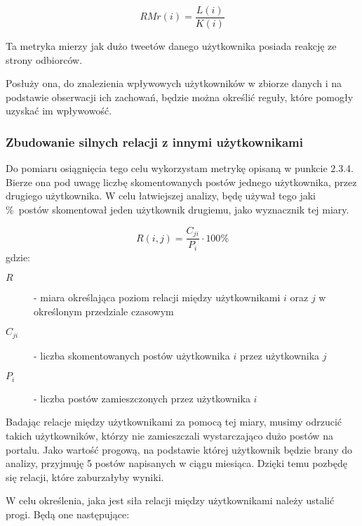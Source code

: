 \documentclass[polish,12pt]{aghthesis}
\begin{document}
\begin{equation}
    RMr(i) = \frac{L(i)}{K(i)} \label{n20}
\end{equation}

Ta metryka mierzy jak dużo tweetów danego użytkownika posiada reakcję ze strony odbiorców.

Posłuży ona, do znalezienia wpływowych użytkowników w zbiorze danych i na podstawie obserwacji ich zachowań, będzie można określić reguły, które pomogły uzyskać im wpływowość.

\subsubsection{Zbudowanie silnych relacji z innymi użytkownikami}


Do pomiaru osiągnięcia tego celu wykorzystam metrykę opisaną w punkcie 2.3.4. Bierze ona pod uwagę liczbę skomentowanych postów jednego użytkownika, przez drugiego użytkownika. W celu łatwiejszej analizy, będę używał tego jaki \%\ postów skomentował jeden użytkownik drugiemu, jako wyznacznik tej miary. 

\begin{equation}
    R(i, j) = \frac{C_{ji}}{P_i}\cdot 100\% \label{n21_2}
\end{equation}
gdzie:
\begin{description}
\item[$R$] - miara określająca poziom relacji między użytkownikami $i$ oraz $j$ w określonym przedziale czasowym
\item[$C_{ji}$] - liczba skomentowanych postów użytkownika $i$ przez użytkownika $j$ 
\item[$P_i$] - liczba postów zamieszczonych przez użytkownika $i$
\end{description}

Badając relacje między użytkownikami za pomocą tej miary, musimy odrzucić takich użytkowników, którzy nie zamieszczali wystarczająco dużo postów na portalu. Jako wartość progową, na podstawie której użytkownik będzie brany do analizy, przyjmuję 5 postów napisanych w ciągu miesiąca. Dzięki temu pozbędę się relacji, które zaburzałyby wyniki.

\vspace{5mm}


W celu określenia, jaka jest siła relacji między użytkownikami należy ustalić progi. Będą one następujące:
\end{document}
